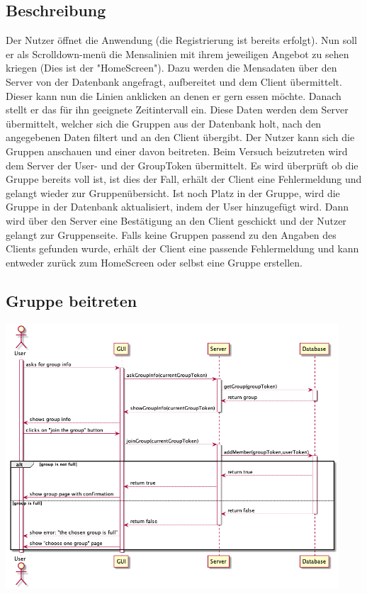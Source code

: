 \documentclass[a4paper]{scrreprt}
\begin{document}
\subsection*{Beschreibung}
Der Nutzer öffnet die Anwendung (die Registrierung ist bereits erfolgt). Nun soll er als Scrolldown-menü die Mensalinien mit ihrem jeweiligen Angebot zu sehen kriegen (Dies ist der "HomeScreen"). Dazu werden die Mensadaten über den Server von der Datenbank angefragt, aufbereitet und dem Client übermittelt. Dieser kann nun die Linien anklicken an denen er gern essen möchte. Danach stellt er das für ihn geeignete Zeitintervall ein. Diese Daten werden dem Server übermittelt, welcher sich die Gruppen aus der Datenbank holt, nach den angegebenen Daten filtert und an den Client übergibt. Der Nutzer kann sich die Gruppen anschauen und einer davon beitreten. Beim Versuch beizutreten wird dem Server der User- und der GroupToken übermittelt. Es wird überprüft ob die Gruppe bereits voll ist, ist dies der Fall, erhält der Client eine Fehlermeldung und gelangt wieder zur Gruppenübersicht. Ist noch Platz in der Gruppe, wird die Gruppe in der Datenbank aktualisiert, indem der User hinzugefügt wird. Dann wird über den Server eine Bestätigung an den Client geschickt und der Nutzer gelangt zur Gruppenseite. 
Falls keine Gruppen passend zu den Angaben des Clients gefunden wurde, erhält der Client eine passende Fehlermeldung und kann entweder zurück zum HomeScreen oder selbst eine Gruppe erstellen.

\newpage
\subsection{Gruppe beitreten}
\begin{center}
	\includegraphics[width=0.93\textwidth]{Sequenzdiagramme/checkInfoAndJoinGroupSD.png}
\end{center}
\end{document}
